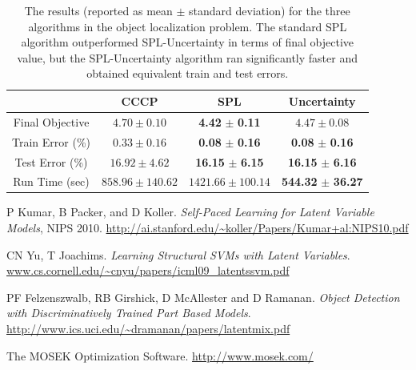 \documentclass{article}
\begin{document}
\begin{table}[h]
\caption{The results (reported as mean $\pm$ standard deviation) for the three algorithms in the object localization problem. The standard SPL algorithm outperformed SPL-Uncertainty in terms of final objective value, but the SPL-Uncertainty algorithm ran significantly faster and obtained equivalent train and test errors.}
\begin{center}
\begin{tabular}{|c|c|c|c|}
\hline  & CCCP & SPL & Uncertainty \\\hline
Final Objective & $4.70 \pm 0.10$ & \textbf{4.42} $\pm$ \textbf{0.11} & $4.47 \pm 0.08$ \\\hline
Train Error (\%) & $0.33 \pm 0.16$ & \textbf{0.08} $\pm$ \textbf{0.16} & \textbf{0.08} $\pm$ \textbf{0.16}  \\ \hline
Test Error (\%) & $16.92 \pm 4.62$ & \textbf{16.15} $\pm$ \textbf{6.15} & \textbf{16.15} $\pm$ \textbf{6.16} \\ \hline
Run Time (sec) & $858.96 \pm 140.62$ & $1421.66 \pm 100.14$ & \textbf{544.32} $\pm$ \textbf{36.27} \\ \hline
\end{tabular}
\end{center}
\label{tbl:bbox}
\end{table}



\newpage
 
\begin{thebibliography}{9}


 P Kumar, B Packer, and D Koller. \emph{Self-Paced Learning for Latent Variable Models},
NIPS 2010. \url{http://ai.stanford.edu/~koller/Papers/Kumar+al:NIPS10.pdf}

 CN Yu, T Joachims. \emph{Learning Structural SVMs with Latent Variables}. \url{www.cs.cornell.edu/~cnyu/papers/icml09_latentssvm.pdf}

 PF Felzenszwalb, RB Girshick, D McAllester and D Ramanan. \emph{Object Detection with Discriminatively Trained
Part Based Models}.  \url{http://www.ics.uci.edu/~dramanan/papers/latentmix.pdf}

 The MOSEK Optimization Software. \url{http://www.mosek.com/}

\end{thebibliography}
\end{document}
